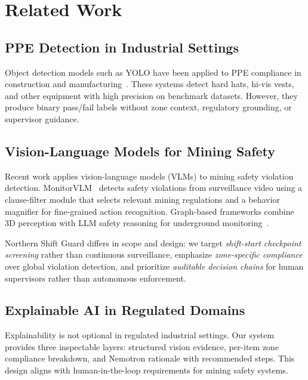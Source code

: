 \section{Related Work}
\label{sec:related}

\subsection{PPE Detection in Industrial Settings}

Object detection models such as YOLO have been applied to PPE compliance in construction and manufacturing~\cite{sh17}. These systems detect hard hats, hi-vis vests, and other equipment with high precision on benchmark datasets. However, they produce binary pass/fail labels without zone context, regulatory grounding, or supervisor guidance.

\subsection{Vision-Language Models for Mining Safety}

Recent work applies vision-language models (VLMs) to mining safety violation detection. MonitorVLM~\cite{monitorvlm2025} detects safety violations from surveillance video using a clause-filter module that selects relevant mining regulations and a behavior magnifier for fine-grained action recognition. Graph-based frameworks combine 3D perception with LLM safety reasoning for underground monitoring~\cite{mdse2026}.

Northern Shift Guard differs in scope and design: we target \emph{shift-start checkpoint screening} rather than continuous surveillance, emphasize \emph{zone-specific compliance} over global violation detection, and prioritize \emph{auditable decision chains} for human supervisors rather than autonomous enforcement.

\subsection{Explainable AI in Regulated Domains}

Explainability is not optional in regulated industrial settings. Our system provides three inspectable layers: structured vision evidence, per-item zone compliance breakdown, and Nemotron rationale with recommended steps. This design aligns with human-in-the-loop requirements for mining safety systems.
